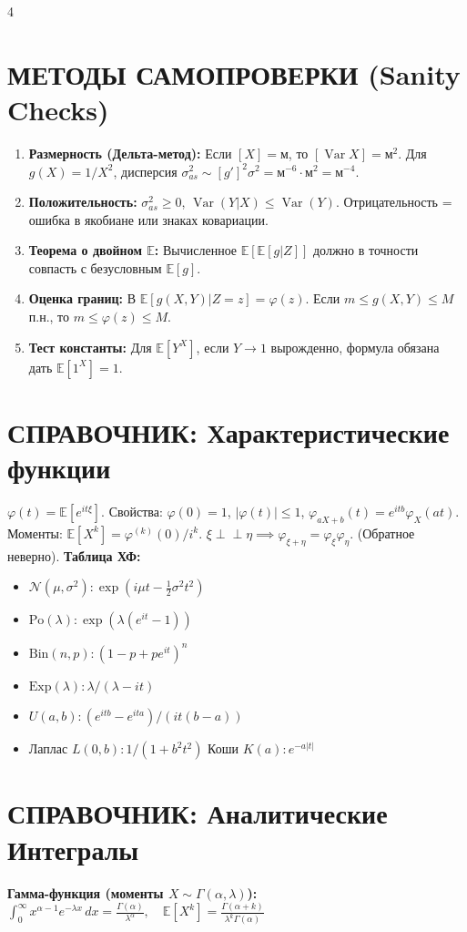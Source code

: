 \documentclass[a4paper, landscape]{article}
\newcommand{\E}{\mathbb{E}}
\newcommand{\N}{\mathcal{N}}
\DeclareMathOperator{\Var}{Var}
\begin{document}
\begin{multicols*}{4}
\section*{МЕТОДЫ САМОПРОВЕРКИ (Sanity Checks)}
\begin{enumerate}[label=\textbf{\arabic*.}]
    \item \textbf{Размерность (Дельта-метод):} Если $[X]\!=\!\text{м}$, то $[\Var X]\!=\!\text{м}^2$. Для $g(X)\!=\!1/X^2$, дисперсия $\sigma_{as}^2 \sim [g']^2 \sigma^2 \!=\! \text{м}^{-6} \cdot \text{м}^2 = \text{м}^{-4}$.
    \item \textbf{Положительность:} $\sigma_{as}^2 \ge 0$, $\Var(Y|X) \le \Var(Y)$. Отрицательность = ошибка в якобиане или знаках ковариации.
    \item \textbf{Теорема о двойном $\E$:} Вычисленное $\E[\E[g|Z]]$ должно в точности совпасть с безусловным $\E[g]$.
    \item \textbf{Оценка границ:} В $\E[g(X,Y)|Z=z]=\varphi(z)$. Если $m \le g(X,Y) \le M$ п.н., то $m \le \varphi(z) \le M$.
    \item \textbf{Тест константы:} Для $\E[Y^X]$, если $Y \to 1$ вырожденно, формула обязана дать $\E[1^X]=1$.
\end{enumerate}

\section*{СПРАВОЧНИК: Характеристические функции}
$\varphi(t) = \E[e^{it\xi}]$. Свойства: $\varphi(0)\!=\!1$, $|\varphi(t)| \!\le\! 1$, $\varphi_{aX+b}(t) \!=\! e^{itb}\varphi_X(at)$. Моменты: $\E[X^k] = \varphi^{(k)}(0) / i^k$.
$\xi \perp\!\!\perp \eta \implies \varphi_{\xi+\eta} = \varphi_\xi \varphi_\eta$. (Обратное неверно).
\textbf{Таблица ХФ:}
\begin{itemize}
    \item $\N(\mu,\sigma^2): \exp(i\mu t - \frac{1}{2}\sigma^2 t^2)$
    \item $\text{Po}(\lambda): \exp(\lambda(e^{it}-1))$
    \item $\text{Bin}(n,p): (1-p+pe^{it})^n$
    \item $\text{Exp}(\lambda): \lambda / (\lambda-it)$
    \item $U(a,b): (e^{itb}-e^{ita}) / (it(b-a))$
    \item Лаплас $L(0,b): 1 / (1+b^2 t^2)$ \quad Коши $K(a): e^{-a|t|}$
\end{itemize}

\section*{СПРАВОЧНИК: Аналитические Интегралы}
\textbf{Гамма-функция (моменты $X \sim \Gamma(\alpha, \lambda)$):}
$\int_0^\infty x^{\alpha-1} e^{-\lambda x} \, dx = \frac{\Gamma(\alpha)}{\lambda^\alpha}, \quad \E[X^k] = \frac{\Gamma(\alpha+k)}{\lambda^k \Gamma(\alpha)}$


\end{multicols*}
\end{document}
